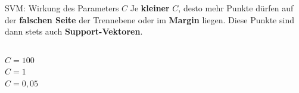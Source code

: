\begin{frame}{SVM: Wirkung des Parameters $C$}
Je \textbf{kleiner} $C$, desto mehr Punkte dürfen auf der \textbf{falschen
Seite} der Trennebene oder im \textbf{Margin} liegen. Diese Punkte sind dann
stets auch \textbf{Support-Vektoren}.


\vspace{2.0em}
\begin{columns}
\centering
\textbf{$C = 100$}\\[2pt]


\centering
\textbf{$C = 1$}\\[2pt]


\centering
\textbf{$C = 0{,}05$}\\[2pt]

\end{columns}
\end{frame}

